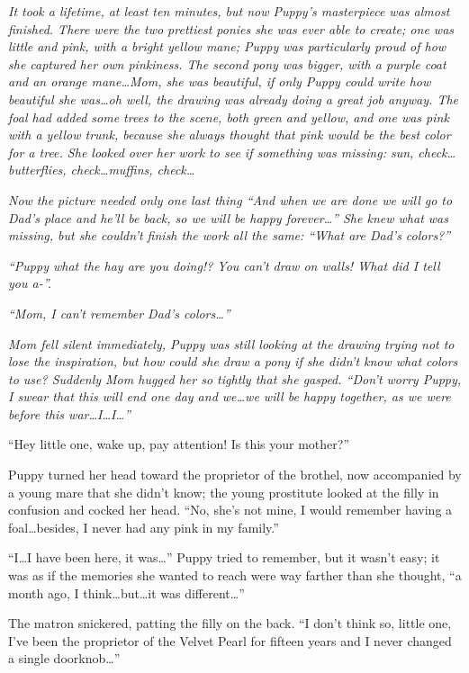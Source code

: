 \emph{It took a lifetime, at least ten minutes, but now Puppy's masterpiece was almost finished. There were the two prettiest ponies she was ever able to create; one was little and pink, with a bright yellow mane; Puppy was particularly proud of how she captured her own pinkiness. The second pony was bigger, with a purple coat and an orange mane\dots Mom, she was beautiful, if only Puppy could write how beautiful she was\dots oh well, the drawing was already doing a great job anyway. The foal had added some trees to the scene, both green and yellow, and one was pink with a yellow trunk, because she always thought that pink would be the best color for a tree. She looked over her work to see if something was missing: sun, check\dots butterflies, check\dots muffins, check\dots}

\emph{Now the picture needed only one last thing ``And when we are done we will go to Dad's place and he'll be back, so we will be happy forever\dots'' She knew what was missing, but she couldn't finish the work all the same: ``What are Dad's colors?''}

\emph{``Puppy what the hay are you doing!? You can't draw on walls! What did I tell you a-''.}

\emph{``Mom, I can't remember Dad's colors\dots''}

\emph{Mom fell silent immediately, Puppy was still looking at the drawing trying not to lose the inspiration, but how could she draw a pony if she didn't know what colors to use? Suddenly Mom hugged her so tightly that she gasped. ``Don't worry Puppy, I swear that this will end one day and we\dots we will be happy together, as we were before this war\dots I\dots I\dots''}

``Hey little one, wake up, pay attention! Is this your mother?''

Puppy turned her head toward the proprietor of the brothel, now accompanied by a young mare that she didn't know; the young prostitute looked at the filly in confusion and cocked her head. ``No, she's not mine, I would remember having a foal\dots besides, I never had any pink in my family.''

``I\dots I have been here, it was\dots'' Puppy tried to remember, but it wasn't easy; it was as if the memories she wanted to reach were way farther than she thought, ``a month ago, I think\dots but\dots it was different\dots''

The matron snickered, patting the filly on the back. ``I don't think so, little one, I've been the proprietor of the Velvet Pearl for fifteen years and I never changed a single doorknob\dots''

